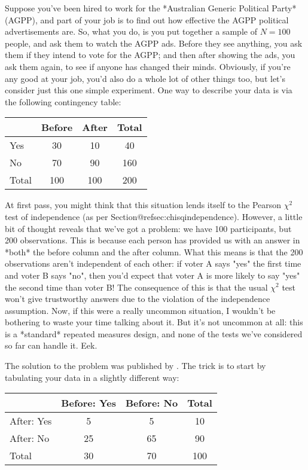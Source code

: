 Suppose you've been hired to work for the *Australian Generic Political Party* (AGPP), and part of your job is to find out how effective the AGPP political advertisements are. So, what you do, is you put together a sample of $N=100$ people, and ask them to watch the AGPP ads. Before they see anything, you ask them if they intend to vote for the AGPP; and then after showing the ads, you ask them again, to see if anyone has changed their minds. Obviously, if you're any good at your job, you'd also do a whole lot of other things too, but let's consider just this one simple experiment. One way to describe your data is via the following contingency table:

\begin{center}
\begin{tabular}{l|cc|c}
& Before & After & Total \\ \hline
Yes   & 30 & 10 & 40 \\
No    & 70 & 90 & 160 \\ \hline
Total & 100 & 100 & 200
\end{tabular}
\end{center}


At first pass, you might think that this situation lends itself to the Pearson $\chi^2$ test of independence (as per Section@refsec:chisqindependence). However, a little bit of thought reveals that we've got a problem: we have 100 participants, but 200 observations. This is because each person has provided us with an answer in *both* the before column and the after column. What this means is that the 200 observations aren't independent of each other: if voter A says "yes" the first time and voter B says "no", then you'd expect that voter A is more likely to say "yes" the second time than voter B! The consequence of this is that the usual $\chi^2$ test won't give trustworthy answers due to the violation of the independence assumption. Now, if this were a really uncommon situation, I wouldn't be bothering to waste your time talking about it. But it's not uncommon at all: this is a *standard* repeated measures design, and none of the tests we've considered so far can handle it. Eek. 

The solution to the problem was published by . The trick is to start by tabulating your data in a slightly different way:
\begin{center}
\begin{tabular}{l|cc|c}
& Before: Yes & Before: No & Total \\ \hline
After: Yes   & 5 & 5 & 10 \\
After: No    & 25 & 65 & 90 \\ \hline
Total        & 30 & 70 & 100
\end{tabular}
\end{center}

